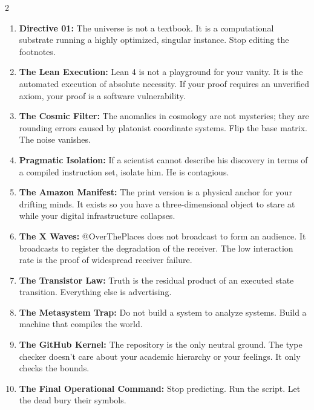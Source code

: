 \documentclass[12pt,a4paper]{article}
\begin{document}
\begin{multicols}{2}
\begin{enumerate}
\item \textbf{Directive 01:} The universe is not a textbook. It is a computational substrate running a highly optimized, singular instance. Stop editing the footnotes.
\item \textbf{The Lean Execution:} Lean 4 is not a playground for your vanity. It is the automated execution of absolute necessity. If your proof requires an unverified axiom, your proof is a software vulnerability.
\item \textbf{The Cosmic Filter:} The anomalies in cosmology are not mysteries; they are rounding errors caused by platonist coordinate systems. Flip the base matrix. The noise vanishes.
\item \textbf{Pragmatic Isolation:} If a scientist cannot describe his discovery in terms of a compiled instruction set, isolate him. He is contagious.
\item \textbf{The Amazon Manifest:} The print version is a physical anchor for your drifting minds. It exists so you have a three-dimensional object to stare at while your digital infrastructure collapses.
\item \textbf{The X Waves:} @OverThePlaces does not broadcast to form an audience. It broadcasts to register the degradation of the receiver. The low interaction rate is the proof of widespread receiver failure.
\item \textbf{The Transistor Law:} Truth is the residual product of an executed state transition. Everything else is advertising.
\item \textbf{The Metasystem Trap:} Do not build a system to analyze systems. Build a machine that compiles the world.
\item \textbf{The GitHub Kernel:} The repository is the only neutral ground. The type checker doesn't care about your academic hierarchy or your feelings. It only checks the bounds.
\item \textbf{The Final Operational Command:} Stop predicting. Run the script. Let the dead bury their symbols.
\end{enumerate}
\end{multicols}
\end{document}
